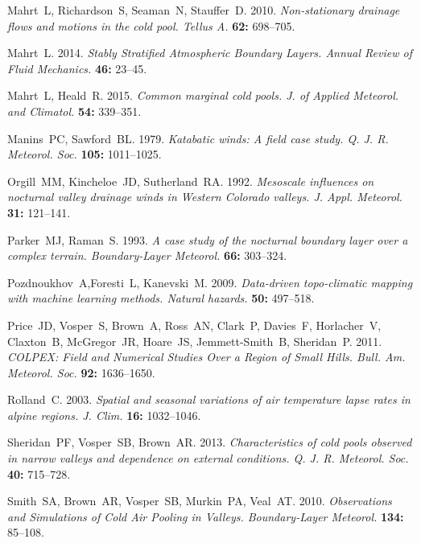 \documentclass[times]{qjrms4}
\begin{document}
\begin{thebibliography}{99}
Mahrt~L, Richardson~S, Seaman~N, Stauffer~D. 2010. \emph{Non-stationary drainage flows and motions in the cold pool. Tellus A.} {\bf 62:} 698--705.

Mahrt~L. 2014. \emph{Stably Stratified Atmospheric Boundary Layers. Annual Review of Fluid Mechanics.} {\bf 46:} 23--45.

Mahrt~L, Heald~R. 2015. \emph{Common marginal cold pools. J. of Applied Meteorol. and Climatol.} {\bf 54:} 339--351.

Manins~PC, Sawford~BL. 1979. \emph{Katabatic winds: A field case study. Q. J. R. Meteorol. Soc.} {\bf 105:} 1011--1025.

Orgill~MM, Kincheloe~JD, Sutherland~RA. 1992. \emph{Mesoscale influences on nocturnal valley drainage winds in Western Colorado valleys. J. Appl. Meteorol.} {\bf 31:} 121--141.

Parker~MJ, Raman~S. 1993. \emph{A case study of the nocturnal boundary layer over a complex terrain. Boundary-Layer Meteorol.} {\bf 66:} 303--324.

Pozdnoukhov~A,Foresti~L, Kanevski~M. 2009. \emph{Data-driven topo-climatic mapping with machine learning methods. Natural hazards.} {\bf 50:} 497--518. 

Price~JD, Vosper~S, Brown~A, Ross~AN, Clark~P, Davies~F, Horlacher~V, Claxton~B, McGregor~JR, Hoare~JS, Jemmett-Smith~B, Sheridan~P. 2011. \emph{COLPEX: Field and Numerical Studies Over a Region of Small Hills. Bull. Am. Meteorol. Soc.} {\bf 92:} 1636--1650.

Rolland~C. 2003. \emph{Spatial and seasonal variations of air temperature lapse rates in alpine regions. J. Clim.} {\bf 16:} 1032--1046.

Sheridan~PF, Vosper~SB, Brown~AR. 2013. \emph{Characteristics of cold pools observed in narrow valleys and dependence on external conditions. Q. J. R. Meteorol. Soc.} {\bf 40:} 715–728.

Smith~SA, Brown~AR, Vosper~SB, Murkin~PA, Veal~AT. 2010. \emph{Observations and Simulations of Cold Air Pooling in Valleys. Boundary-Layer Meteorol.} {\bf 134:} 85--108.


\end{thebibliography}
\end{document}
